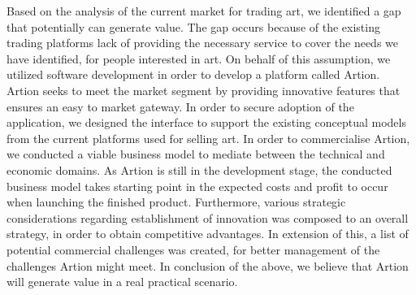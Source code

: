 Based on the analysis of the current market for trading art, we identified a gap that potentially can generate value. The gap occurs because of the existing trading platforms lack of providing
the necessary service to cover the needs we have identified, for people interested in art. On behalf of this assumption, we utilized software development in order to develop a platform called Artion.\\ 

Artion seeks to meet the market segment by providing innovative features that ensures an easy to market gateway. In order to secure adoption of the application, we designed the interface to support the existing conceptual models from the current platforms used for selling art. In order to commercialise Artion, we conducted a viable business model to mediate between the technical and economic domains. As Artion is still in the development stage, the conducted business model takes starting point in the expected costs and profit to occur when launching the finished product. Furthermore, various strategic considerations regarding establishment of innovation was composed to an overall strategy, in order to obtain competitive advantages. In extension of this, a list of potential commercial challenges was created, for better management of the challenges Artion might meet. In conclusion of the above, we believe that Artion will generate value in a real practical scenario. 